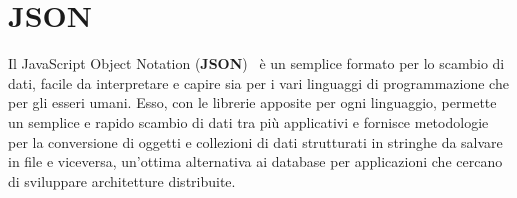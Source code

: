 \newpage

\section{JSON}
\label{sub:json}
Il JavaScript Object Notation (\textbf{JSON})~\cite{json} è un semplice formato per lo scambio di dati,
facile da interpretare e capire sia per i vari linguaggi di programmazione che per gli esseri umani.
Esso, con le librerie apposite per ogni linguaggio, permette un semplice e rapido scambio
di dati tra più applicativi e fornisce metodologie per la conversione di oggetti e collezioni
di dati strutturati in stringhe da salvare in file e viceversa, un’ottima alternativa ai database
per applicazioni che cercano di sviluppare architetture distribuite.
